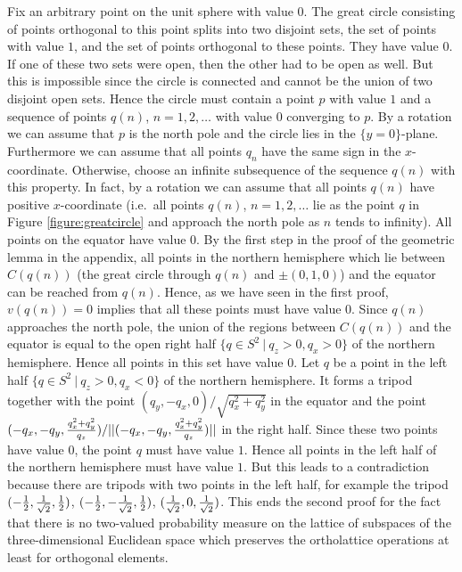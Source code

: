 Fix an arbitrary point on the unit sphere with value $0$.
The  great circle consisting of points orthogonal to this
point splits into two disjoint sets, the set of points
with value $1$, and the set of points orthogonal to these
points. They have value $0$. If one of these two
sets were open, then the other had to be open as well.
But this is impossible since the circle is connected
and cannot be the union of two disjoint open sets.
Hence the circle must contain a point $p$ with value $1$
and a sequence of points $q(n)$, $n=1,2,\ldots$ with value $0$ converging
to $p$. By a rotation we can assume that $p$ is the
north pole and the circle lies in the $\{y=0\}$-plane.
Furthermore we can assume that all points $q_n$ have
the same sign in the $x$-coordinate. Otherwise,  choose
an infinite subsequence of the sequence $q(n)$ with this property.
In fact, by a rotation we can assume that all points $q(n)$ have
positive $x$-coordinate (i.e.\ all points $q(n)$, $n=1,2,\ldots$
lie as the point $q$ in  Figure \ref{figure:greatcircle} and approach the
north pole as $n$ tends to infinity).
All points on the equator have value $0$.
By the first step in the proof of the geometric lemma in the appendix,
all points in the northern hemisphere which lie between $C(q(n))$
(the great circle through $q(n)$ and $\pm(0,1,0)$)
and the equator can be reached from $q(n)$. Hence, as we
have seen in the first proof, $v(q(n))=0$ implies that
all these points must have value $0$.
Since $q(n)$ approaches
the north pole, the union of the regions between $C(q(n))$ and
the equator is equal to the open right half
$\{q \in S^2\ | \ q_z>0, q_x>0\}$
of the northern hemisphere.
%
%
 Hence all points in this set
have value $0$.  Let $q$ be a point in the left half
$\{q \in S^2\ | \ q_z>0, q_x<0\}$ of the northern hemisphere.
It forms a tripod together with the point
$(q_y,-q_x,0)/\sqrt{q_x^2+q_y^2}$ in the equator and the point
$(-q_x,-q_y,{q_x^2+q_y^2 \over q_z}) /
        ||(-q_x,-q_y,{q_x^2+q_y^2 \over q_z})||$
in the right half. Since these two points have value $0$,
the point $q$ must have value $1$. Hence all points
in the left half of the northern hemisphere must have
value $1$. But this leads to a contradiction because
there are tripods with two points in the left half,
for example the tripod
$(-{1 \over 2},{1 \over \sqrt{2}},{1 \over 2})$,
$(-{1 \over 2},-{1 \over \sqrt{2}},{1 \over 2})$,
$({1 \over \sqrt{2}},0,{1 \over \sqrt{2}})$.
This ends the second proof for the fact that
there is no two-valued probability measure
on the lattice of subspaces of the three-dimensional
Euclidean space which preserves the ortholattice operations
at least for orthogonal elements.



